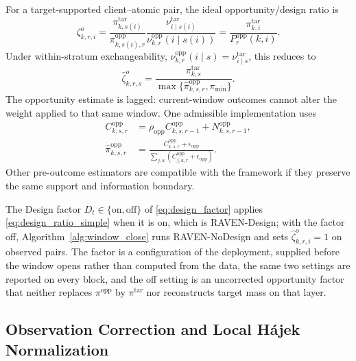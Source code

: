 \documentclass[letterpaper,journal]{IEEEtran}
\begin{document}
For a target-supported client--atomic pair, the ideal opportunity/design ratio is
\begin{equation}
 \zeta^{o}_{k,r,i}
 =
 \frac{\pi^{\mathrm{tar}}_{k,s(i)}}
      {\pi^{\mathrm{opp}}_{k,s(i),r}}
 \frac{\nu^{\mathrm{tar}}_{i\mid s(i)}}
      {\nu^{\mathrm{opp}}_{k,r}(i\mid s(i))}
 =
 \frac{\pi^{\mathrm{tar}}_{k,i}}
      {P_r^{\mathrm{opp}}(k,i)}.
 \label{eq:design_ratio_general}
\end{equation}
Under within-stratum exchangeability,
$\nu^{\mathrm{opp}}_{k,r}(i\mid s)=\nu^{\mathrm{tar}}_{i\mid s}$, this reduces to
\begin{equation}
 \widehat\zeta^{o}_{k,r,s}
 =
 \frac{\pi^{\mathrm{tar}}_{k,s}}
 {\max\{\widehat\pi^{\mathrm{opp}}_{k,s,r},\pi_{\min}\}}.
 \label{eq:design_ratio_simple}
\end{equation}
The opportunity estimate is lagged: current-window outcomes cannot alter the
weight applied to that same window.  One admissible implementation uses
\begin{align*}
 C^{\mathrm{opp}}_{k,s,r}
 &=
 \rho_{\mathrm{opp}}C^{\mathrm{opp}}_{k,s,r-1}
 +N^{\mathrm{opp}}_{k,s,r-1},\\
 \widehat\pi^{\mathrm{opp}}_{k,s,r}
 &=
 \frac{C^{\mathrm{opp}}_{k,s,r}+\epsilon_{\mathrm{opp}}}
 {\sum_{j,u}
 (C^{\mathrm{opp}}_{j,u,r}+\epsilon_{\mathrm{opp}})}.
\end{align*}
Other pre-outcome estimators are compatible with the framework if they preserve
the same support and information boundary.

The Design factor $D_t\in\{\mathrm{on},\mathrm{off}\}$ of
\eqref{eq:design_factor} applies \eqref{eq:design_ratio_simple} when it is on,
which is RAVEN-Design; with the factor off,
Algorithm~\ref{alg:window_close} runs RAVEN-NoDesign and sets
$\widehat\zeta^{o}_{k,r,i}=1$ on observed pairs.  The factor is a configuration of
the deployment, supplied before the window opens rather than computed from the
data, the same two settings are reported on every block, and the off setting is
an uncorrected opportunity factor that neither replaces $\pi^{\mathrm{opp}}$ by
$\pi^{\mathrm{tar}}$ nor reconstructs target mass on that layer.

\subsection{Observation Correction and Local H\'ajek Normalization}
\label{subsec:observation_hajek}
\end{document}
